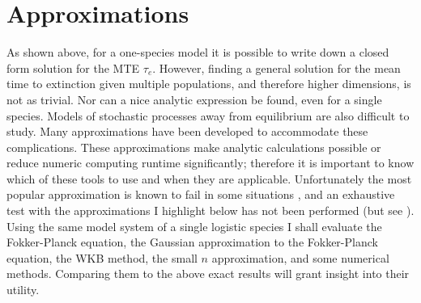 \section{Approximations}%

As shown above, for a one-species model it is possible to write down a closed form solution for the MTE $\tau_e$.
However, finding a general solution for the mean time to extinction given multiple populations, and therefore higher dimensions, is not as trivial. Nor can a nice analytic expression be found, even for a single species. 
Models of stochastic processes away from equilibrium are also difficult to study. 
Many approximations have been developed to accommodate these complications. 
These approximations make analytic calculations possible or reduce numeric computing runtime significantly; therefore it is important to know which of these tools to use and when they are applicable. 
Unfortunately the most popular approximation is known to fail in some situations \cite{Grasman1983,Doering2005}, and an exhaustive test with the approximations I highlight below has not been performed (but see \cite{Allen2003a,Yu2017}). 
Using the same model system of a single logistic species I shall evaluate the Fokker-Planck equation, the Gaussian approximation to the Fokker-Planck equation, the WKB method, the small $n$ approximation, and some numerical methods. 
Comparing them to the above exact results will grant insight into their utility. %

